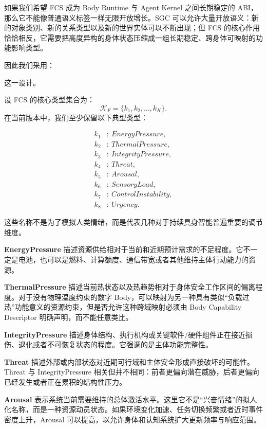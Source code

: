 如果我们希望 FCS 成为 Body Runtime 与 Agent Kernel 之间长期稳定的 ABI，那么它不能像普通语义标签一样无限开放增长。SGC 可以允许大量开放语义：新的对象类别、新的关系类型以及新的世界实体可以不断出现；但 FCS 的核心作用恰恰相反，它需要把高度异构的身体状态压缩成一组长期稳定、跨身体可映射的功能影响类型。

因此我们采用：
\begin{statementbox}
\centering
{}
\end{statementbox}
这一设计。

设 FCS 的核心类型集合为：
\[
\mathcal K_F
=
\{
k_1,k_2,\ldots,k_K
\}.
\]
在当前版本中，我们至少保留以下典型类型：

\[
\begin{aligned}
k_1 &:\ EnergyPressure,\\
k_2 &:\ ThermalPressure,\\
k_3 &:\ IntegrityPressure,\\
k_4 &:\ Threat,\\
k_5 &:\ Arousal,\\
k_6 &:\ SensoryLoad,\\
k_7 &:\ ControlInstability,\\
k_8 &:\ Urgency.
\end{aligned}
\]

这些名称不是为了模拟人类情绪，而是代表几种对于持续具身智能普遍重要的调节维度。

\textbf{EnergyPressure} 描述资源供给相对于当前和近期预计需求的不足程度。它不一定是电池，也可以是燃料、计算额度、通信带宽或者其他维持主体行动能力的资源。

\textbf{ThermalPressure} 描述当前热状态以及热趋势相对于身体安全工作区间的偏离程度。对于没有物理温度约束的数字 Body，可以映射为另一种具有类似“负载过热”功能意义的资源约束，但是否允许这种跨域映射必须由 Body Capability Descriptor 明确声明，而不能任意类比。

\textbf{IntegrityPressure} 描述身体结构、执行机构或关键软件/硬件组件正在接近损伤、退化或者不可恢复状态的程度。它强调的是主体功能完整性。

\textbf{Threat} 描述外部或内部状态对近期可行域和主体安全形成直接破坏的可能性。Threat 与 IntegrityPressure 相关但并不相同：前者更偏向潜在威胁，后者更偏向已经发生或者正在累积的结构性压力。

\textbf{Arousal} 表示系统当前需要维持的总体激活水平。这里它不是“兴奋情绪”的拟人化名称，而是一种资源动员状态。如果环境变化加速、任务切换频繁或者近时事件密度上升，Arousal 可以提高，以允许身体和认知系统扩大更新频率与响应范围。

